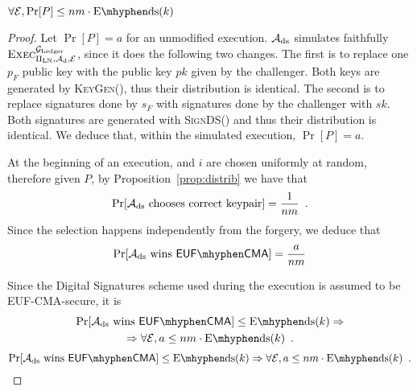   \begin{proposition}
  \label{prop:forgery:ds}
    $\forall \environment, \Pr[P] \leq nm \cdot \mathrm{E \mhyphen ds}(k)$
  \end{proposition}

  \begin{proof}
    Let $\Pr[P] = a$ for an unmodified execution. $\mathcal{A}_{\mathrm{ds}}$
    simulates faithfully $\textsc{Exec}^{\mathcal{G}_{\mathrm{Ledger}}}_{\Pi_{\mathrm{LN}},
    \mathcal{A}_{\mathrm{d}}, \mathcal{E}}$, since it does the following two
    changes. The first is to replace one $p_F$ public key with the public key
    $pk$ given by the challenger. Both keys are generated by \textsc{KeyGen}(),
    thus their distribution is identical. The second is to replace signatures
    done by $s_F$ with signatures done by the challenger with $sk$. Both
    signatures are generated with \textsc{SignDS}() and thus their distribution
    is identical. We deduce that, within the simulated execution, $\Pr[P] = a$.

    At the beginning of an execution, \alice{} and $i$ are chosen uniformly at
    random, therefore given $P$, by Proposition~\ref{prop:distrib} we have that
    \begin{equation*}
      \Pr[\mathcal{A}_{\mathrm{ds}} \text{ chooses correct keypair}] =
      \frac{1}{nm} \enspace.
    \end{equation*}
    Since the selection happens independently from the forgery, we deduce that
    \begin{equation*}
      \Pr[\adversary_{\mathrm{ds}} \text{ wins } \mathsf{EUF \mhyphen CMA}] =
      \frac{a}{nm}
    \end{equation*}

    Since the Digital Signatures scheme used during the execution is assumed to
    be \textsf{EUF-CMA}-secure, it is
    \ifelseieee
      {\begin{gather*}
        \Pr[\adversary_{\mathrm{ds}} \text{ wins } \mathsf{EUF \mhyphen CMA}] \leq
        \mathrm{E \mhyphen ds}(k) \Rightarrow \\
        \Rightarrow \forall \environment, a \leq nm \cdot \mathrm{E \mhyphen
        ds}(k) \enspace.
      \end{gather*}}
      {\begin{equation*}
        \Pr[\adversary_{\mathrm{ds}} \text{ wins } \mathsf{EUF \mhyphen CMA}] \leq
        \mathrm{E \mhyphen ds}(k) \Rightarrow \forall \environment, a \leq nm
        \cdot \mathrm{E \mhyphen ds}(k) \enspace.
      \end{equation*}}
  \end{proof}

